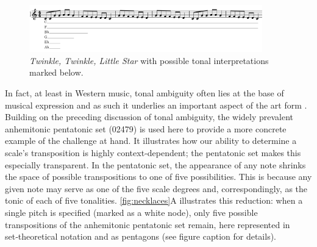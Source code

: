 \documentclass[10pt,twocolumn]{article}
\numberwithin{equation}{section} %
\begin{document}
    \begin{figure}[htbp]
        \centering
        \includegraphics[width=0.9\textwidth]{figures/twinkle}%
        \caption{\emph{Twinkle, Twinkle, Little Star} with possible tonal interpretations marked below.}        \label{fig:twinkle}
    \end{figure}

    In fact, at least in Western music, tonal ambiguity often lies at the base of musical expression and as such it underlies an important aspect of the art form \citep{NodenSkinner1984, Richards2017, Smith1992, Temperley2007, Uchida1990}.
    Building on the preceding discussion of tonal ambiguity, the widely prevalent anhemitonic pentatonic set (02479) is used here to provide a more concrete example of the challenge at hand.
    It illustrates how our ability to determine a scale’s transposition is highly context‑dependent; the pentatonic set makes this especially transparent.
    In the pentatonic set, the appearance of any note shrinks the space of possible transpositions to one of five possibilities.
    This is because any given note may serve as one of the five scale degrees and, correspondingly, as the tonic of each of five tonalities.
    \autoref{fig:necklaces}A illustrates this reduction: when a single pitch is specified (marked as a white node), only five possible transpositions of the anhemitonic pentatonic set remain, here represented in set‑theoretical notation and as pentagons (see figure caption for details).
\end{document}

